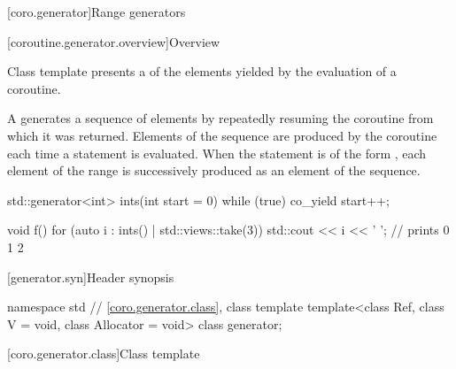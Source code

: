 [coro.generator]{Range generators}

[coroutine.generator.overview]{Overview}

\pnum
Class template  presents
a  of the elements yielded by the evaluation of a coroutine.

\pnum
A  generates a sequence of elements by
repeatedly resuming the coroutine from which it was returned.
Elements of the sequence are produced by the coroutine
each time a  statement is evaluated.
When the  statement is of the form
,
each element of the range 
is successively produced as an element of the sequence.
\begin{example}
\begin{codeblock}
std::generator<int> ints(int start = 0) {
  while (true)
    co_yield start++;
}

void f() {
  for (auto i : ints() | std::views::take(3))
    std::cout << i << ' ';      // prints 0 1 2
}
\end{codeblock}
\end{example}

[generator.syn]{Header  synopsis}

%
\begin{codeblock}
namespace std {
  // \ref{coro.generator.class}, class template 
  template<class Ref, class V = void, class Allocator = void>
    class generator;
}
\end{codeblock}

[coro.generator.class]{Class template }

